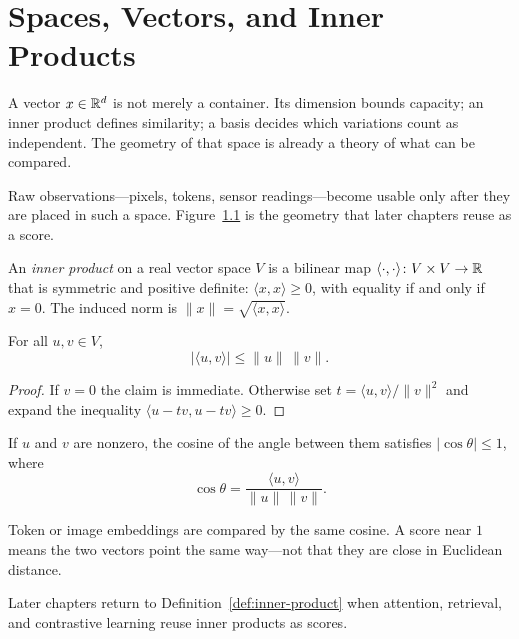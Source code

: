 \chapter{Spaces, Vectors, and Inner Products}
\label{ch:spaces-and-inner-products}

A vector $x \in \mathbb{R}^d$ is not merely a container. Its dimension bounds capacity; an inner product defines similarity; a basis decides which variations count as independent. The geometry of that space is already a theory of what can be compared.

Raw observations---pixels, tokens, sensor readings---become usable only after they are placed in such a space. Figure~\ref{fig:inner-product} is the geometry that later chapters reuse as a score.

\begin{figure}[htbp]
  \centering
  
  \label{fig:inner-product}
\end{figure}

\begin{definition}
\label{def:inner-product}
An \emph{inner product} on a real vector space $V$ is a bilinear map
$\langle \cdot,\cdot\rangle \colon V\times V\to\mathbb{R}$ that is symmetric and
positive definite: $\langle x,x\rangle\ge 0$, with equality if and only if $x=0$.
The induced norm is $\lVert x\rVert=\sqrt{\langle x,x\rangle}$.
\end{definition}

\begin{theorem}
\label{thm:cauchy-schwarz}
For all $u,v\in V$,
\[
\lvert\langle u,v\rangle\rvert \le \lVert u\rVert\,\lVert v\rVert.
\]
\end{theorem}

\begin{proof}
If $v=0$ the claim is immediate. Otherwise set
$t=\langle u,v\rangle/\lVert v\rVert^2$ and expand the inequality
$\langle u-tv,u-tv\rangle\ge 0$.
\end{proof}

\begin{corollary}
\label{cor:cosine-bound}
If $u$ and $v$ are nonzero, the cosine of the angle between them satisfies
$\lvert\cos\theta\rvert\le 1$, where
\[
\cos\theta=\frac{\langle u,v\rangle}{\lVert u\rVert\,\lVert v\rVert}.
\]
\end{corollary}

\begin{example}
\label{ex:cosine-similarity}
Token or image embeddings are compared by the same cosine. A score near $1$
means the two vectors point the same way---not that they are close in Euclidean
distance.
\end{example}

\begin{remark}
Later chapters return to Definition~\ref{def:inner-product} when attention,
retrieval, and contrastive learning reuse inner products as scores.
\end{remark}
